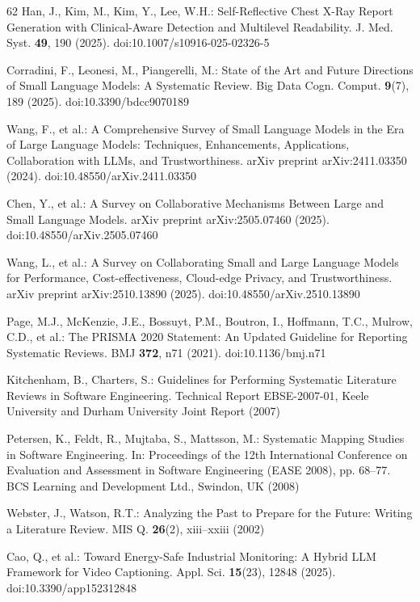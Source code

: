 \begin{thebibliography}{62}
Han, J., Kim, M., Kim, Y., Lee, W.H.: Self-Reflective Chest X-Ray Report Generation with Clinical-Aware Detection and Multilevel Readability. J. Med. Syst. \textbf{49}, 190 (2025). doi:10.1007/s10916-025-02326-5

Corradini, F., Leonesi, M., Piangerelli, M.: State of the Art and Future Directions of Small Language Models: A Systematic Review. Big Data Cogn. Comput. \textbf{9}(7), 189 (2025). doi:10.3390/bdcc9070189

Wang, F., et al.: A Comprehensive Survey of Small Language Models in the Era of Large Language Models: Techniques, Enhancements, Applications, Collaboration with LLMs, and Trustworthiness. arXiv preprint arXiv:2411.03350 (2024). doi:10.48550/arXiv.2411.03350

Chen, Y., et al.: A Survey on Collaborative Mechanisms Between Large and Small Language Models. arXiv preprint arXiv:2505.07460 (2025). doi:10.48550/arXiv.2505.07460

Wang, L., et al.: A Survey on Collaborating Small and Large Language Models for Performance, Cost-effectiveness, Cloud-edge Privacy, and Trustworthiness. arXiv preprint arXiv:2510.13890 (2025). doi:10.48550/arXiv.2510.13890

Page, M.J., McKenzie, J.E., Bossuyt, P.M., Boutron, I., Hoffmann, T.C., Mulrow, C.D., et al.: The PRISMA 2020 Statement: An Updated Guideline for Reporting Systematic Reviews. BMJ \textbf{372}, n71 (2021). doi:10.1136/bmj.n71

Kitchenham, B., Charters, S.: Guidelines for Performing Systematic Literature Reviews in Software Engineering. Technical Report EBSE-2007-01, Keele University and Durham University Joint Report (2007)

Petersen, K., Feldt, R., Mujtaba, S., Mattsson, M.: Systematic Mapping Studies in Software Engineering. In: Proceedings of the 12th International Conference on Evaluation and Assessment in Software Engineering (EASE 2008), pp. 68--77. BCS Learning and Development Ltd., Swindon, UK (2008)

Webster, J., Watson, R.T.: Analyzing the Past to Prepare for the Future: Writing a Literature Review. MIS Q. \textbf{26}(2), xiii--xxiii (2002)

Cao, Q., et al.: Toward Energy-Safe Industrial Monitoring: A Hybrid LLM Framework for Video Captioning. Appl. Sci. \textbf{15}(23), 12848 (2025). doi:10.3390/app152312848


\end{thebibliography}
